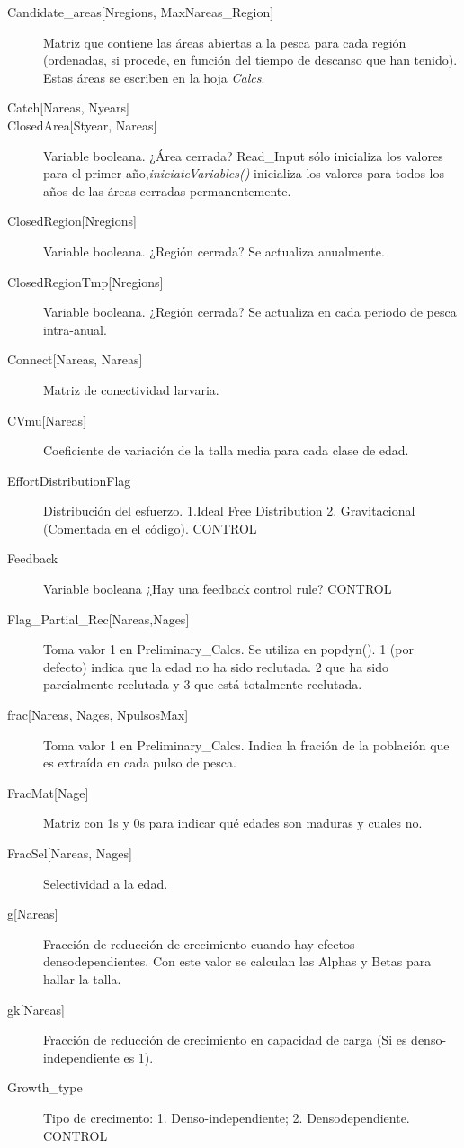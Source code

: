 \begin{description}
		
		\item[Candidate\_areas{[}Nregions, MaxNareas\_Region{]}] Matriz que contiene las áreas abiertas a la pesca para cada región (ordenadas, si procede, en función del tiempo de descanso que han tenido). Estas áreas se escriben en la hoja \emph{Calcs}.
		\item[Catch{[}Nareas, Nyears{]}]
		\item[ClosedArea{[}Styear, Nareas{]}] Variable booleana. ¿Área cerrada? Read\_Input sólo inicializa los valores para el primer año,\emph{iniciateVariables()} inicializa los valores para todos los años de las áreas cerradas permanentemente.
		\item[ClosedRegion{[}Nregions{]}] Variable booleana. ¿Región cerrada? Se actualiza anualmente.
		\item[ClosedRegionTmp{[}Nregions{]}] Variable booleana. ¿Región cerrada? Se actualiza en cada periodo de pesca intra-anual.		
		\item[Connect{[}Nareas, Nareas{]}] Matriz de conectividad larvaria.
		\item[CVmu{[}Nareas{]}] Coeficiente de variación de la talla media para cada clase de edad.
		
		\item[EffortDistributionFlag] Distribución del esfuerzo. 1.Ideal Free Distribution 2. Gravitacional (Comentada en el código). CONTROL
		
		\item[Feedback] Variable booleana ¿Hay una feedback control rule? CONTROL
		\item[Flag\_Partial\_Rec{[}Nareas,Nages{]}] Toma valor 1 en Preliminary\_Calcs. Se utiliza en popdyn(). 1 (por defecto) indica que la edad no ha sido reclutada. 2 que ha sido parcialmente reclutada y 3 que está totalmente reclutada.
		\item[frac{[}Nareas, Nages, NpulsosMax{]}] Toma valor 1 en Preliminary\_Calcs. Indica la fración de la población que es extraída en cada pulso de pesca.
		\item[FracMat{[}Nage{]}] Matriz con 1s y 0s para indicar qué edades son maduras y cuales no. 
		\item[FracSel{[}Nareas, Nages{]}] Selectividad a la edad. 
		   
		\item[g{[}Nareas{]}] Fracción de reducción de crecimiento cuando hay efectos densodependientes. Con este valor se calculan las Alphas y Betas para hallar la talla.
		\item[gk{[}Nareas{]}] Fracción de reducción de crecimiento en capacidad de carga (Si es denso-independiente es 1).
		\item[Growth\_type] Tipo de crecimento: 1. Denso-independiente; 2. Densodependiente. CONTROL
		

\end{description}
